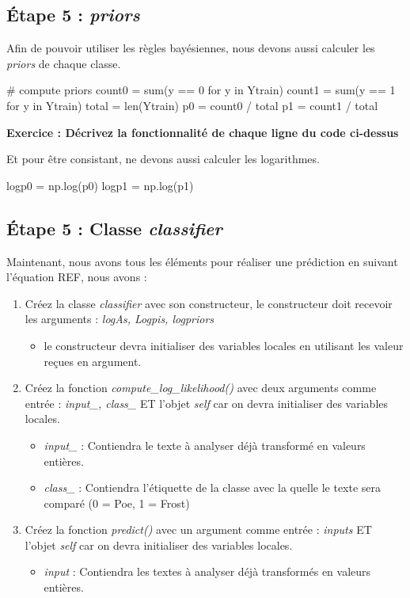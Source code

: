 \subsection{Étape 5 : \textit{priors}}

Afin de pouvoir utiliser les règles bayésiennes, nous devons aussi calculer les \textit{priors} de chaque classe. 

\begin{python}
# compute priors
count0 = sum(y == 0 for y in Ytrain)
count1 = sum(y == 1 for y in Ytrain)
total = len(Ytrain)
p0 = count0 / total
p1 = count1 / total
\end{python}
\textbf{Exercice : Décrivez la fonctionnalité de chaque ligne du code ci-dessus}
\vspace{5cm}

Et pour être consistant, ne devons aussi calculer les logarithmes.

\begin{python}
logp0 = np.log(p0)
logp1 = np.log(p1)
\end{python}

\subsection{Étape 5 : Classe \textit{classifier}}
Maintenant, nous avons tous les éléments pour réaliser une prédiction en suivant l’équation REF, nous avons :
\begin{enumerate}
	\item Créez la classe \textit{classifier} avec son constructeur, le constructeur doit recevoir les arguments : \textit{logAs, Logpis, logpriors}
	\begin{itemize}
		\item le constructeur devra initialiser des variables locales en utilisant les valeur reçues en argument.
	\end{itemize}
	\item Créez la fonction \textit{compute\_log\_likelihood()} avec deux arguments comme entrée : \textit{input\_, class\_} ET l'objet \textit{self} car on devra initialiser des variables locales.
	\begin{itemize}
		\item \textit{input\_} : Contiendra le texte à analyser déjà transformé en valeurs entières.
		\item \textit{class\_} : Contiendra l'étiquette de la classe avec la quelle le texte sera comparé (0 = Poe, 1 = Frost)
	\end{itemize}
	\item Créez la fonction \textit{predict()} avec un argument comme entrée : \textit{inputs} ET l'objet \textit{self} car on devra initialiser des variables locales.
	\begin{itemize}
		\item \textit{input} : Contiendra les textes à analyser déjà transformés en valeurs entières.
	\end{itemize}
\end{enumerate}